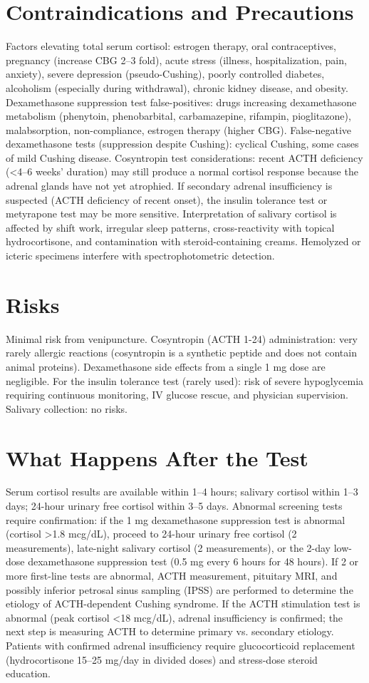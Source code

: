 \section*{Contraindications and Precautions}
Factors elevating total serum cortisol: estrogen therapy, oral contraceptives, pregnancy (increase CBG 2--3 fold), acute stress (illness, hospitalization, pain, anxiety), severe depression (pseudo-Cushing), poorly controlled diabetes, alcoholism (especially during withdrawal), chronic kidney disease, and obesity. Dexamethasone suppression test false-positives: drugs increasing dexamethasone metabolism (phenytoin, phenobarbital, carbamazepine, rifampin, pioglitazone), malabsorption, non-compliance, estrogen therapy (higher CBG). False-negative dexamethasone tests (suppression despite Cushing): cyclical Cushing, some cases of mild Cushing disease. Cosyntropin test considerations: recent ACTH deficiency (<4--6 weeks' duration) may still produce a normal cortisol response because the adrenal glands have not yet atrophied. If secondary adrenal insufficiency is suspected (ACTH deficiency of recent onset), the insulin tolerance test or metyrapone test may be more sensitive. Interpretation of salivary cortisol is affected by shift work, irregular sleep patterns, cross-reactivity with topical hydrocortisone, and contamination with steroid-containing creams. Hemolyzed or icteric specimens interfere with spectrophotometric detection.

\section*{Risks}
Minimal risk from venipuncture. Cosyntropin (ACTH 1-24) administration: very rarely allergic reactions (cosyntropin is a synthetic peptide and does not contain animal proteins). Dexamethasone side effects from a single 1 mg dose are negligible. For the insulin tolerance test (rarely used): risk of severe hypoglycemia requiring continuous monitoring, IV glucose rescue, and physician supervision. Salivary collection: no risks.

\section*{What Happens After the Test}
Serum cortisol results are available within 1--4 hours; salivary cortisol within 1--3 days; 24-hour urinary free cortisol within 3--5 days. Abnormal screening tests require confirmation: if the 1 mg dexamethasone suppression test is abnormal (cortisol >1.8 mcg/dL), proceed to 24-hour urinary free cortisol (2 measurements), late-night salivary cortisol (2 measurements), or the 2-day low-dose dexamethasone suppression test (0.5 mg every 6 hours for 48 hours). If 2 or more first-line tests are abnormal, ACTH measurement, pituitary MRI, and possibly inferior petrosal sinus sampling (IPSS) are performed to determine the etiology of ACTH-dependent Cushing syndrome. If the ACTH stimulation test is abnormal (peak cortisol <18 mcg/dL), adrenal insufficiency is confirmed; the next step is measuring ACTH to determine primary vs. secondary etiology. Patients with confirmed adrenal insufficiency require glucocorticoid replacement (hydrocortisone 15--25 mg/day in divided doses) and stress-dose steroid education.

